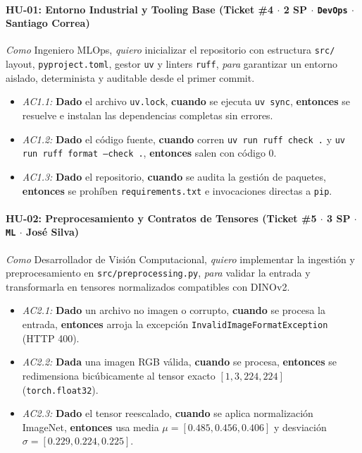 \documentclass[12pt,letterpaper]{article}
\begin{document}
\paragraph{HU-01: Entorno Industrial y Tooling Base (Ticket \#4 $\cdot$ 2 SP $\cdot$ \texttt{DevOps} $\cdot$ Santiago Correa)}
\textit{Como} Ingeniero MLOps, \textit{quiero} inicializar el repositorio con estructura \texttt{src/} layout, \texttt{pyproject.toml}, gestor \texttt{uv} y linters \texttt{ruff}, \textit{para} garantizar un entorno aislado, determinista y auditable desde el primer commit.
\begin{itemize}[leftmargin=*,noitemsep]
    \item \textit{AC1.1:} \textbf{Dado} el archivo \texttt{uv.lock}, \textbf{cuando} se ejecuta \texttt{uv sync}, \textbf{entonces} se resuelve e instalan las dependencias completas sin errores.
    \item \textit{AC1.2:} \textbf{Dado} el código fuente, \textbf{cuando} corren \texttt{uv run ruff check .} y \texttt{uv run ruff format --check .}, \textbf{entonces} salen con código 0.
    \item \textit{AC1.3:} \textbf{Dado} el repositorio, \textbf{cuando} se audita la gestión de paquetes, \textbf{entonces} se prohíben \texttt{requirements.txt} e invocaciones directas a \texttt{pip}.
\end{itemize}

\paragraph{HU-02: Preprocesamiento y Contratos de Tensores (Ticket \#5 $\cdot$ 3 SP $\cdot$ \texttt{ML} $\cdot$ José Silva)}
\textit{Como} Desarrollador de Visión Computacional, \textit{quiero} implementar la ingestión y preprocesamiento en \texttt{src/preprocessing.py}, \textit{para} validar la entrada y transformarla en tensores normalizados compatibles con DINOv2.
\begin{itemize}[leftmargin=*,noitemsep]
    \item \textit{AC2.1:} \textbf{Dado} un archivo no imagen o corrupto, \textbf{cuando} se procesa la entrada, \textbf{entonces} arroja la excepción \texttt{InvalidImage\allowbreak FormatException} (HTTP 400).
    \item \textit{AC2.2:} \textbf{Dada} una imagen RGB válida, \textbf{cuando} se procesa, \textbf{entonces} se redimensiona bicúbicamente al tensor exacto $[1, 3, 224, 224]$ (\texttt{torch.float32}).
    \item \textit{AC2.3:} \textbf{Dado} el tensor reescalado, \textbf{cuando} se aplica normalización ImageNet, \textbf{entonces} usa media $\mu = [0.485, 0.456, 0.406]$ y desviación $\sigma = [0.229, 0.224, 0.225]$.
\end{itemize}
\end{document}
